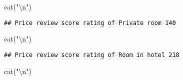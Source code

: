 \documentclass[
]{article}
\newenvironment{Shaded}{\begin{snugshade}}{\end{snugshade}}
\newcommand{\FunctionTok}[1]{\textcolor[rgb]{0.00,0.00,0.00}{#1}}
\newcommand{\NormalTok}[1]{#1}
\newcommand{\OtherTok}[1]{\textcolor[rgb]{0.56,0.35,0.01}{#1}}
\newcommand{\SpecialCharTok}[1]{\textcolor[rgb]{0.00,0.00,0.00}{#1}}
\newcommand{\StringTok}[1]{\textcolor[rgb]{0.31,0.60,0.02}{#1}}
\begin{document}
\begin{Shaded}
\begin{Highlighting}[]
\FunctionTok{cat}\NormalTok{(}\StringTok{"}\SpecialCharTok{\textbackslash{}n}\StringTok{"}\NormalTok{)}
\end{Highlighting}
\end{Shaded}

\begin{Shaded}
\end{Shaded}

\begin{verbatim}
## Price review score rating of Private room 140
\end{verbatim}

\begin{Shaded}
\begin{Highlighting}[]
\FunctionTok{cat}\NormalTok{(}\StringTok{"}\SpecialCharTok{\textbackslash{}n}\StringTok{"}\NormalTok{)}
\end{Highlighting}
\end{Shaded}

\begin{Shaded}
\end{Shaded}

\begin{verbatim}
## Price review score rating of Room in hotel 218
\end{verbatim}

\begin{Shaded}
\begin{Highlighting}[]
\FunctionTok{cat}\NormalTok{(}\StringTok{"}\SpecialCharTok{\textbackslash{}n}\StringTok{"}\NormalTok{)}
\end{Highlighting}
\end{Shaded}
\end{document}
